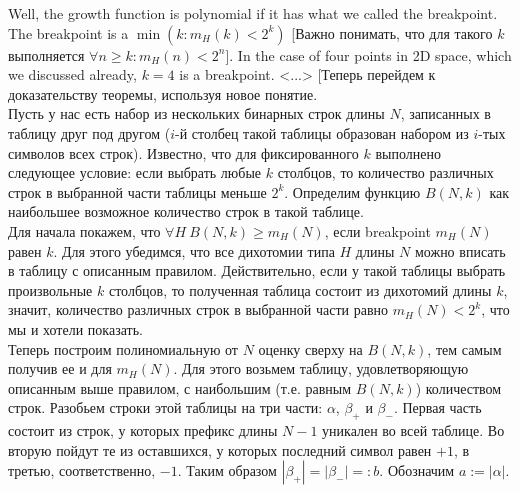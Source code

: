 Well, the growth function is polynomial if it has what we called the breakpoint. The breakpoint is a $\min(k:m_H(k)<2^k)$ [Важно понимать, что для такого $k$ выполняется $\forall n\ge k\colon m_H(n)<2^n$]. In the case of four points in 2D space, which we discussed already, $k=4$ is a breakpoint. <...> [Теперь перейдем к доказательству теоремы, используя новое понятие.\\
Пусть у нас есть набор из нескольких бинарных строк длины $N$, записанных в таблицу друг под другом ($i$-й столбец такой таблицы образован набором из $i$-тых символов всех строк). Известно, что для фиксированного $k$ выполнено следующее условие: если выбрать любые $k$ столбцов, то количество различных строк в выбранной части таблицы меньше $2^k$. Определим функцию $B(N,k)$ как наибольшее возможное количество строк в такой таблице.\\
Для начала покажем, что $\forall H\ B(N,k)\ge m_H(N)$, если breakpoint $m_H(N)$ равен $k$. Для этого убедимся, что все дихотомии типа $H$ длины $N$ можно вписать в таблицу с описанным правилом. Действительно, если у такой таблицы выбрать произвольные $k$ столбцов, то полученная таблица состоит из дихотомий длины $k$, значит, количество различных строк в выбранной части равно $m_H(N)<2^k$, что мы и хотели показать.\\
Теперь построим полиномиальную от $N$ оценку сверху на $B(N,k)$, тем самым получив ее и для $m_H(N)$. Для этого возьмем таблицу, удовлетворяющую описанным выше правилом, с наибольшим (т.е. равным $B(N,k)$) количеством строк. Разобьем строки этой таблицы на три части: $\alpha$, $\beta_+$ и $\beta_-$. Первая часть состоит из строк, у которых префикс длины $N-1$ уникален во всей таблице. Во вторую пойдут те из оставшихся, у которых последний символ равен $+1$, в третью, соответственно, $-1$. Таким образом $|\beta_+|=|\beta_-|=:b$. Обозначим $a:=|\alpha|$.\\
